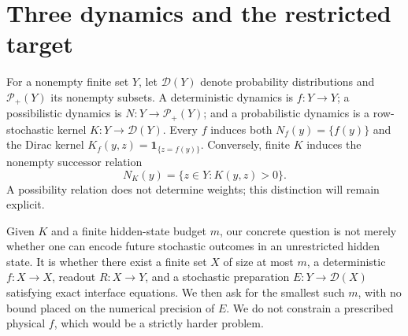 \documentclass[11pt,letterpaper]{article}
\theoremstyle{definition}\newtheorem{definition}[theorem]{Definition}
\theoremstyle{remark}\newtheorem{remark}[theorem]{Remark}
\newcommand{\D}{\mathcal{D}}
\newcommand{\PP}{\mathcal{P}}
\newcommand{\one}{\mathbf{1}}
\begin{document}
\section{Three dynamics and the restricted target}
For a nonempty finite set $Y$, let $\D(Y)$ denote probability distributions and $\PP_+(Y)$ its nonempty subsets. A deterministic dynamics is $f:Y\to Y$; a possibilistic dynamics is $N:Y\to\PP_+(Y)$; and a probabilistic dynamics is a row-stochastic kernel $K:Y\to\D(Y)$. Every $f$ induces both $N_f(y)=\{f(y)\}$ and the Dirac kernel $K_f(y,z)=\one_{\{z=f(y)\}}$. Conversely, finite $K$ induces the nonempty successor relation
\begin{equation}\label{eq:support}
N_K(y)=\{z\in Y:K(y,z)>0\}.
\end{equation}
A possibility relation does not determine weights; this distinction will remain explicit.

Given $K$ and a finite hidden-state budget $m$, our concrete question is not merely whether one can encode future stochastic outcomes in an unrestricted hidden state. It is whether there exist a finite set $X$ of size at most $m$, a deterministic $f:X\to X$, readout $R:X\to Y$, and a stochastic preparation $E:Y\to\D(X)$ satisfying exact interface equations. We then ask for the smallest such $m$, with no bound placed on the numerical precision of $E$. We do not constrain a prescribed physical $f$, which would be a strictly harder problem.
\end{document}
